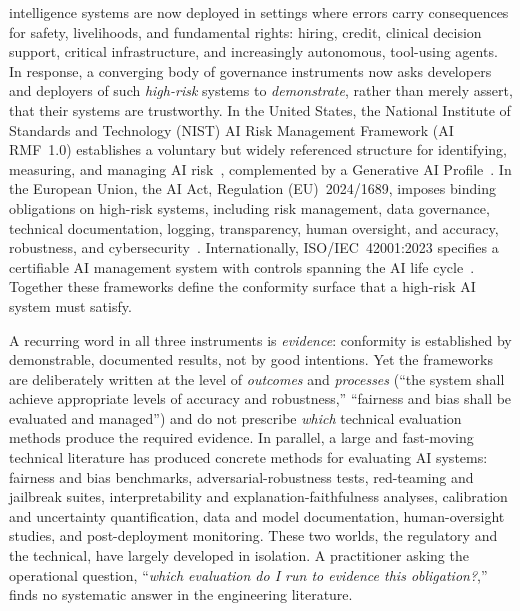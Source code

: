  intelligence systems are now deployed in settings where errors carry
consequences for safety, livelihoods, and fundamental rights: hiring, credit, clinical
decision support, critical infrastructure, and increasingly autonomous, tool-using
agents. In response, a converging body of governance instruments now asks developers and
deployers of such \emph{high-risk} systems to \emph{demonstrate}, rather than merely
assert, that their systems are trustworthy. In the United States, the National Institute
of Standards and Technology (NIST) AI Risk Management Framework (AI RMF~1.0) establishes a
voluntary but widely referenced structure for identifying, measuring, and managing AI
risk~\cite{nist2023airmf}, complemented by a Generative AI Profile~\cite{nist2024genai}.
In the European Union, the AI Act, Regulation (EU)~2024/1689, imposes binding
obligations on high-risk systems, including risk management, data governance, technical
documentation, logging, transparency, human oversight, and accuracy, robustness, and
cybersecurity~\cite{euaiact2024}. Internationally, ISO/IEC~42001:2023 specifies a
certifiable AI management system with controls spanning the AI life
cycle~\cite{iso42001}. Together these frameworks define the conformity surface that a
high-risk AI system must satisfy.

A recurring word in all three instruments is \emph{evidence}: conformity is established
by demonstrable, documented results, not by good intentions. Yet the frameworks are
deliberately written at the level of \emph{outcomes} and \emph{processes} (``the system
shall achieve appropriate levels of accuracy and robustness,'' ``fairness and bias shall
be evaluated and managed'') and do not prescribe \emph{which} technical evaluation
methods produce the required evidence. In parallel, a large and fast-moving technical
literature has produced concrete methods for evaluating AI systems: fairness and bias
benchmarks, adversarial-robustness tests, red-teaming and jailbreak suites,
interpretability and explanation-faithfulness analyses, calibration and uncertainty
quantification, data and model documentation, human-oversight studies, and post-deployment
monitoring. These two worlds, the regulatory and the technical, have largely developed
in isolation. A practitioner asking the operational question, ``\emph{which evaluation do
I run to evidence this obligation?},'' finds no systematic answer in the engineering
literature.

